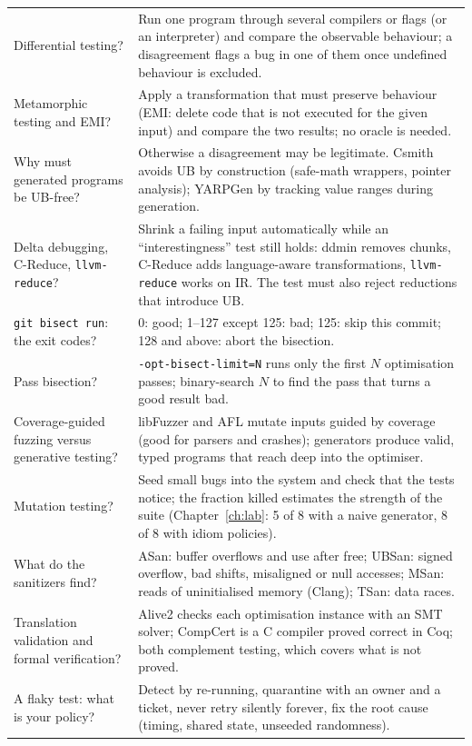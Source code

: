 \documentclass[10pt,a4paper,openany,oneside]{report}
\begin{document}
\begin{center}
\begin{xltabular}{\textwidth}{@{}L{4.6cm}Y@{}}
Differential testing? & Run one program through several compilers or flags (or an interpreter) and compare the observable behaviour; a disagreement flags a bug in one of them once undefined behaviour is excluded.\\
Metamorphic testing and EMI? & Apply a transformation that must preserve behaviour (EMI: delete code that is not executed for the given input) and compare the two results; no oracle is needed.\\
Why must generated programs be UB-free? & Otherwise a disagreement may be legitimate. Csmith avoids UB by construction (safe-math wrappers, pointer analysis); YARPGen by tracking value ranges during generation.\\
Delta debugging, C-Reduce, \texttt{llvm-reduce}? & Shrink a failing input automatically while an ``interestingness'' test still holds: ddmin removes chunks, C-Reduce adds language-aware transformations, \texttt{llvm-reduce} works on IR. The test must also reject reductions that introduce UB.\\
\texttt{git bisect run}: the exit codes? & 0: good; 1--127 except 125: bad; 125: skip this commit; 128 and above: abort the bisection.\\
Pass bisection? & \texttt{-opt-bisect-limit=N} runs only the first $N$ optimisation passes; binary-search $N$ to find the pass that turns a good result bad.\\
Coverage-guided fuzzing versus generative testing? & libFuzzer and AFL mutate inputs guided by coverage (good for parsers and crashes); generators produce valid, typed programs that reach deep into the optimiser.\\
Mutation testing? & Seed small bugs into the system and check that the tests notice; the fraction killed estimates the strength of the suite (Chapter~\ref{ch:lab}: 5 of 8 with a naive generator, 8 of 8 with idiom policies).\\
What do the sanitizers find? & ASan: buffer overflows and use after free; UBSan: signed overflow, bad shifts, misaligned or null accesses; MSan: reads of uninitialised memory (Clang); TSan: data races.\\
Translation validation and formal verification? & Alive2 checks each optimisation instance with an SMT solver; CompCert is a C compiler proved correct in Coq; both complement testing, which covers what is not proved.\\
A flaky test: what is your policy? & Detect by re-running, quarantine with an owner and a ticket, never retry silently forever, fix the root cause (timing, shared state, unseeded randomness).\\

\end{xltabular}
\end{center}
\end{document}
